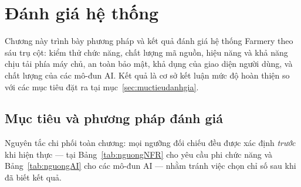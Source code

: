 \chapter{Đánh giá hệ thống}
\label{chap:danhgia}

Chương này trình bày phương pháp và kết quả đánh giá hệ thống Farmery theo sáu trụ cột: kiểm thử chức năng, chất lượng mã nguồn, hiệu năng và khả năng chịu tải phía máy chủ, an toàn bảo mật, khả dụng của giao diện người dùng, và chất lượng của các mô-đun AI. Kết quả là cơ sở kết luận mức độ hoàn thiện so với các mục tiêu đặt ra tại mục~\ref{sec:muctieudanhgia}.

\section{Mục tiêu và phương pháp đánh giá}
\label{sec:muctieuphuongphap}

Nguyên tắc chi phối toàn chương: mọi ngưỡng đối chiếu đều được xác định \emph{trước} khi hiện thực --- tại Bảng~\ref{tab:nguongNFR} cho yêu cầu phi chức năng và Bảng~\ref{tab:nguongAI} cho các mô-đun AI --- nhằm tránh việc chọn chỉ số sau khi đã biết kết quả.

